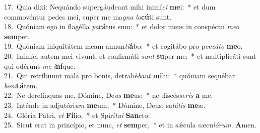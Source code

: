 {17.~}Quia dixi: Nequándo supergáudeant mihi inimí\textit{ci} \textbf{me}i:~* et dum commovéntur pedes mei, super me ma\textit{gna} \textit{lo}\textbf{cú}ti sunt.\\
{18.~}Quóniam ego in flagélla \textit{pa}\textbf{rá}tus sum:~* et dolor meus in conspéctu \textit{me}\textit{o} \textbf{sem}per.\\
{19.~}Quóniam iniquitátem meam annun\textit{ti}\textbf{á}bo:~* et cogitábo pro pec\textit{cá}\textit{to} \textbf{me}o.\\
{20.~}Inimíci autem mei vivunt, et confirmáti \textit{sunt} \textbf{su}per me:~* et multiplicáti sunt qui odérunt \textit{me} \textit{i}\textbf{ní}que.\\
{21.~}Qui retríbuunt mala pro bonis, detrahé\textit{bant} \textbf{mi}hi:~* quóniam sequébar \textit{bo}\textit{ni}\textbf{tá}tem.\\
{22.~}Ne derelínquas me, Dómine, De\textit{us} \textbf{me}us:~* ne discés\textit{se}\textit{ris} \textbf{a} me.\\
{23.~}Inténde in adjutóri\textit{um} \textbf{me}um,~* Dómine, Deus, sa\textit{lú}\textit{tis} \textbf{me}æ.\\
{24.~}Glória Patri, \textit{et} \textbf{Fí}lio,~* et Spirí\textit{tu}\textit{i} \textbf{San}cto.\\
{25.~}Sicut erat in princípio, et nunc, \textit{et} \textbf{sem}per,~* et in sǽcula sæcu\textit{ló}\textit{rum}. \textbf{A}men.\\
